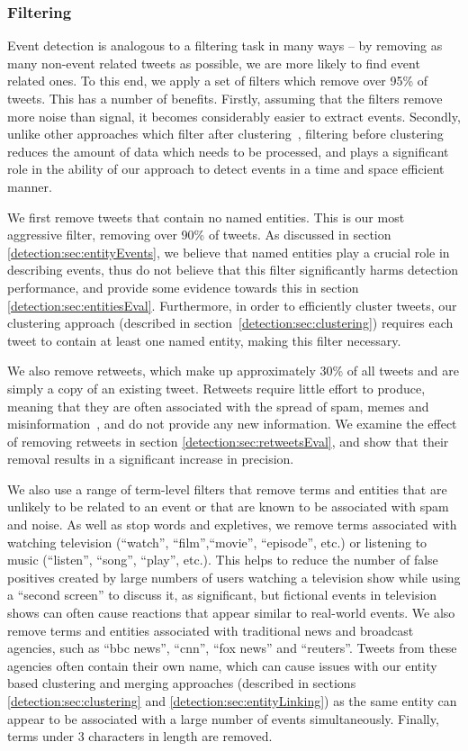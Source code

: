 \subsubsection{Filtering}
Event detection is analogous to a filtering task in many ways -- by removing as many non-event related tweets as possible, we are more likely to find event related ones. To this end, we apply a set of filters which remove over 95\% of tweets.
This has a number of benefits.
Firstly, assuming that the filters remove more noise than signal, it becomes considerably easier to extract events.
Secondly, unlike other approaches which filter after clustering~\citep{Petrovic:2010:SFS:1857999.1858020,becker2011beyond}, filtering before clustering reduces the amount of data which needs to be processed, and plays a significant role in the ability of our approach to detect events in a time and space efficient manner.

We first remove tweets that contain no named entities.
This is our most aggressive filter, removing over 90\% of tweets.
As discussed in section \ref{detection:sec:entityEvents}, we believe that named entities play a crucial role in describing events, thus do not believe that this filter significantly harms detection performance, and provide some evidence towards this in section \ref{detection:sec:entitiesEval}.
Furthermore, in order to efficiently cluster tweets, our clustering approach (described in section~\ref{detection:sec:clustering}) requires each tweet to contain at least one named entity, making this filter necessary.

We also remove retweets, which make up approximately 30\% of all tweets and are simply a copy of an existing tweet.
Retweets require little effort to produce, meaning that they are often associated with the spread of spam, memes and misinformation~\citep{Grier:2010:SUC:1866307.1866311}, and do not provide any new information.
We examine the effect of removing retweets in section \ref{detection:sec:retweetsEval}, and show that their removal results in a significant increase in precision.

We also use a range of term-level filters that remove terms and entities that are unlikely to be related to an event or that are known to be associated with spam and noise.
As well as stop words and expletives, we remove terms associated with watching television (``watch'', ``film'',``movie'', ``episode'', etc.) or listening to music (``listen'', ``song'', ``play'', etc.).
This helps to reduce the number of false positives created by large numbers of users watching a television show while using a ``second screen'' to discuss it, as significant, but fictional events in television shows can often cause reactions that appear similar to real-world events.
We also remove terms and entities associated with traditional news and broadcast agencies, such as ``bbc news'', ``cnn'', ``fox news'' and ``reuters''.
Tweets from these agencies often contain their own name, which can cause issues with our entity based clustering and merging approaches (described in sections \ref{detection:sec:clustering} and \ref{detection:sec:entityLinking}) as the same entity can appear to be associated with a large number of events simultaneously.
Finally, terms under 3 characters in length are removed.

